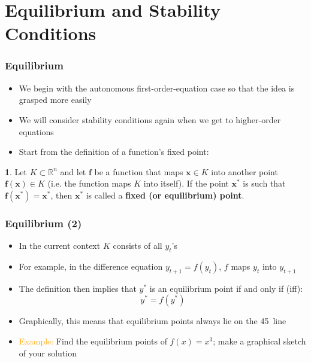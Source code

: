 \documentclass[10pt,usenames,dvipsnames]{beamer}
\theoremstyle{plain}
\theoremstyle{definition}
\newtheorem{defn}{\translate{Definition}}
\begin{document}
\section{Equilibrium and Stability Conditions}
\begin{frame}[fragile]
\frametitle{Equilibrium}

\begin{itemize}
	\item We begin with the autonomous first-order-equation case so that the idea is grasped more easily
	\item We will consider stability conditions again when we get to higher-order equations
	\item Start from the definition of a function's fixed point:
\end{itemize}

\setcounter{defn}{-1}
\begin{defn}
Let $K \subset \mathbb{R}^{n}$ and let $\mathbf{f}$ be a function that maps $\mathbf{x} \in K$ into another point $\mathbf{f}(\mathbf{x})\in K$ (i.e. the function maps $K$ into itself). If the point $\mathbf{x}^{*}$ is such that $\mathbf{f}(\mathbf{x}^{*}) = \mathbf{x}^{*}$, then $\mathbf{x}^{*}$ is called a \textbf{fixed (or equilibrium) point}.
\end{defn}

\end{frame}

\begin{frame}[fragile]
\frametitle{Equilibrium (2)}
\begin{itemize}
	\item In the current context $K$ consists of all $y_{t}$'s
	\item For example, in the difference equation $y_{t+1} = f(y_{t})$, $f$ maps $y_{t}$ into $y_{t+1}$
	\item The definition then implies that $y^{*}$ is an equilibrium point if and only if (iff):
	\[
		y^{*} = f(y^{*})
	\]
	\item Graphically, this means that equilibrium points always lie on the 45\degree\ line
	\item \textcolor{orange}{Example:} Find the equilibrium points of $f(x) = x^{3}$; make a graphical sketch of your solution
\end{itemize}
\end{frame}
\end{document}
